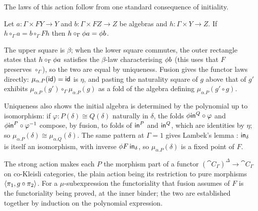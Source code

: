 The laws of this action follow from one standard consequence of initiality.

\begin{lemma}[Fusion]
\label{lem:polynomial-types:fusion}
Let $a : \Gamma \times FY \to Y$ and $b : \Gamma \times FZ \to Z$ be algebras and $h : \Gamma \times
Y \to Z$. If $h \circ_\Gamma a = b \circ_\Gamma Fh$ then $h \circ_\Gamma \phi{a} = \phi{b}$.
\end{lemma}
\begin{center}
\end{center}
\noindent
The upper square is $\beta$; when the lower square commutes, the outer rectangle states that
$h \circ_\Gamma \phi{a}$ satisfies the $\beta$-law characterising $\phi{b}$ (this uses that $F$
preserves $\circ_\Gamma$), so the two are equal by uniqueness. Fusion gives the functor laws directly:
$\mu_{\alpha.P}(\mathsf{id}) = \mathsf{id}$ is $\eta$, and pasting the naturality square of $g$ above that of $g'$
exhibits $\mu_{\alpha.P}(g') \circ_\Gamma \mu_{\alpha.P}(g)$ as a fold of the algebra defining
$\mu_{\alpha.P}(g' \circ g)$.

Uniqueness also shows the initial algebra is determined by the polynomial up to isomorphism:
if $\varphi : P(\delta) \cong Q(\delta)$ naturally in $\delta$, the folds
$\phi{\mathsf{in}^Q \circ \varphi}$ and $\phi{\mathsf{in}^P \circ \varphi^{-1}}$ compose, by fusion, to folds
of $\mathsf{in}^P$ and $\mathsf{in}^Q$, which are identities by $\eta$; so $\mu_{\alpha.P}(\delta) \cong
\mu_{\alpha.Q}(\delta)$. The same pattern at $\Gamma = 1$ gives Lambek's lemma \citep{lambek68}:
$\mathsf{in}_\delta$ is itself an isomorphism, with inverse $\phi{F\,\mathsf{in}_\delta}$, so
$\mu_{\alpha.P}(\delta)$ is a fixed point of $F$.

The strong action makes each $P$ the morphism part of a functor $(\cat{C}_\Gamma)^\Delta \to
\cat{C}_\Gamma$ on co-Kleisli categories, the plain action being its restriction to pure morphisms
$\langle \pi_1, g \circ \pi_2\rangle$. For a $\mu$-subexpression the functoriality that fusion assumes of
$F$ is the functoriality being proved, at the inner binder; the two are established together by
induction on the polynomial expression.
